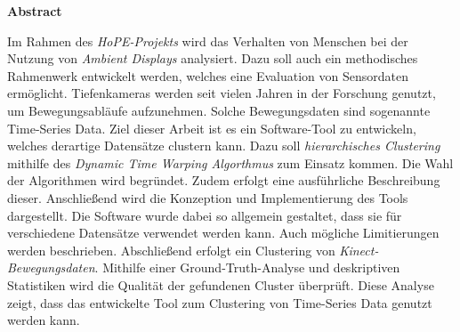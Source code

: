 \vspace*{2cm}

\begin{center}
    \textbf{Abstract}
\end{center}

\vspace*{1cm}

\noindent
Im Rahmen des \emph{HoPE-Projekts} wird das Verhalten von Menschen
bei der Nutzung von \emph{Ambient Displays} analysiert.
Dazu soll auch ein methodisches Rahmenwerk entwickelt werden,
welches eine Evaluation von Sensordaten ermöglicht.
Tiefenkameras werden seit vielen Jahren in der Forschung genutzt,
um Bewegungsabläufe aufzunehmen.
Solche Bewegungsdaten sind sogenannte Time-Series Data.
Ziel dieser Arbeit ist es ein Software-Tool zu entwickeln,
welches derartige Datensätze clustern kann.
Dazu soll \emph{hierarchisches Clustering}
mithilfe des \emph{Dynamic Time Warping Algorthmus} zum Einsatz kommen.
Die Wahl der Algorithmen wird begründet.
Zudem erfolgt eine ausführliche Beschreibung dieser.
Anschließend wird die Konzeption und Implementierung des Tools dargestellt.
Die Software wurde dabei so allgemein gestaltet,
dass sie für verschiedene Datensätze verwendet werden kann.
Auch mögliche Limitierungen werden beschrieben.
Abschließend erfolgt ein Clustering von \emph{Kinect-Bewegungsdaten}.
Mithilfe einer Ground-Truth-Analyse und deskriptiven Statistiken
wird die Qualität der gefundenen Cluster überprüft.
Diese Analyse zeigt, dass das entwickelte Tool zum Clustering
von Time-Series Data genutzt werden kann.